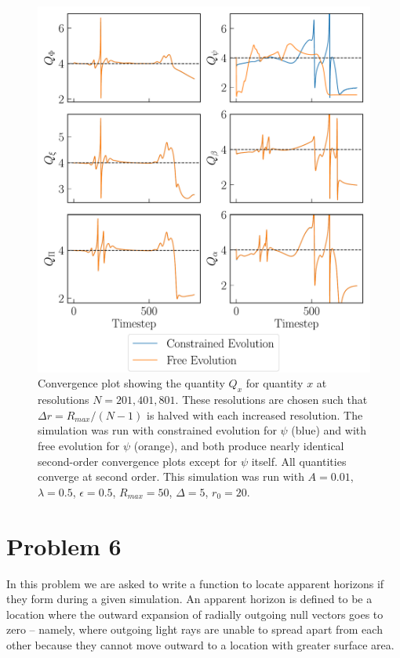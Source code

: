 \documentclass[12pt]{article}
\numberwithin{equation}{section}
\begin{document}
\begin{figure}
	\includegraphics[width=\textwidth]{conv_plot.pdf}
	\caption{Convergence plot showing the quantity $Q_x$ for quantity $x$ at resolutions $N = 201, 401, 801$.  These resolutions are chosen such that $\Delta r = R_{max}/(N-1)$ is halved with each increased resolution.  The simulation was run with constrained evolution for $\psi$ (blue) and with free evolution for $\psi$ (orange), and both produce nearly identical second-order convergence plots except for $\psi$ itself.  All quantities converge at second order.  This simulation was run with $A = 0.01$, $\lambda = 0.5$, $\epsilon = 0.5$, $R_{max}=50$, $\Delta = 5$, $r_0 = 20$.}
\end{figure}


\section{Problem 6}
In this problem we are asked to write a function to locate apparent horizons if they form during a given simulation.  An apparent horizon is defined to be a location where the outward expansion of radially outgoing null vectors goes to zero -- namely, where outgoing light rays are unable to spread apart from each other because they cannot move outward to a location with greater surface area.  
\end{document}

